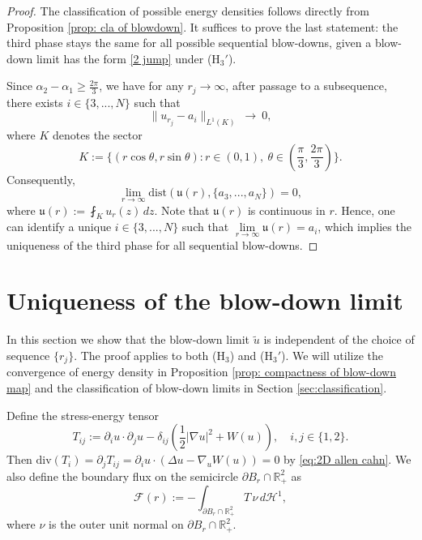 \documentclass[leqno,11pt]{amsart}
\let\pa=\partial
\let\al=\alpha
\let\f=\frac
\let\pa=\partial
\let\na=\nabla
\theoremstyle{remark}
\newcommand{\dist}{\mathrm{dist}}
\newcommand{\BR}{\mathbb{R}}
\newcommand{\ch}{\mathcal{H}^1}
\begin{document}
\begin{proof}
The classification of possible energy densities follows directly from Proposition \ref{prop: cla of blowdown}. It suffices to prove the last statement: the third phase stays the same for all possible sequential blow-downs, given a blow-down limit has the form \eqref{2 jump} under ($\mathrm{H}_3'$). 

Since $\al_2-\al_1\geq \frac{2\pi}{3}$, we have for any $r_j\to\infty$, after passage to a subsequence, there exists $i\in \{3,...,N\}$ such that  
\begin{equation*}
    \|u_{r_j} -a_i\|_{L^1 (K)}\ \rightarrow\ 0,
\end{equation*}
where $K$ denotes the sector 
\begin{equation*}
    K:=\{(r\cos\theta,r\sin\theta):r\in(0,1),\ \theta\in(\f{\pi}{3},\f{2\pi}{3})\}.
\end{equation*}
Consequently, 
\begin{equation*}
    \lim\limits_{r\to\infty} \dist(\mathfrak{u}(r), \{a_3,...,a_N\})=0,
\end{equation*}
where $\mathfrak{u}(r):= \fint_{K} u_r(z)\,dz $. Note that $\mathfrak{u}(r)$ is continuous in $r$. Hence, one can identify a unique $i\in\{3,...,N\}$ such that $\lim\limits_{r\to\infty} \mathfrak{u}(r)=a_i$, which implies the uniqueness of the third phase for all sequential blow-downs. 
    
\end{proof}



\section{Uniqueness of the blow-down limit}\label{sec:uniqueness}

In this section we show that the blow-down limit $\tilde{u}$ is independent of the choice of sequence $\{r_j\}$. The proof applies to both ($\mathrm{H}_{3}$) and ($\mathrm{H}_{3}'$). We will utilize the convergence of energy density in Proposition \ref{prop: compactness of blow-down map} and the classification of blow-down limits in Section \ref{sec:classification}.

Define the stress-energy tensor
    \begin{equation*}
        T_{ij}:= \pa_{i} u\cdot \pa_{j}u -\delta_{ij}\left(\f12|\na u|^2+W(u)\right),\quad i,j\in\{1,2\}.
    \end{equation*}
Then $\mathrm{div}(T_i)=\pa_{j}T_{ij}= \pa_{i} u\cdot(\Delta u-\nabla_u W(u))=0$ by \eqref{eq:2D allen cahn}. We also define the boundary flux on the semicircle $\pa B_r\cap \BR_+^2$ as
\begin{equation*}
    \mathcal{F}(r):= -\int_{\pa B_r\cap \BR_+^2} T\,\nu\,d\ch,
\end{equation*}
where $\nu$ is the outer unit normal on $\pa B_r\cap \BR_+^2$. 
\end{document}
